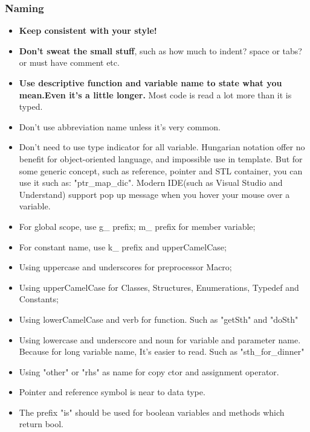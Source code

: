 \documentclass[a4paper,12pt,twoside]{book}
\begin{document}
\subsubsection{Naming}
\begin{itemize}
\item \textbf{Keep consistent with your style!}
\item \textbf{Don't sweat the small stuff}, such as how much to indent? space or tabs? or must have comment etc.

\item \textbf{Use descriptive function and variable name to state what you mean.Even it's a little longer.} Most code is read a lot more than it is typed.

\item Don't use abbreviation name unless it's very common.

\item Don't need to use type indicator for all variable. Hungarian notation offer no benefit for object-oriented language, and impossible use in template. But for some generic concept, such as reference, pointer and STL container, you can use it such as: "ptr\_map\_dic". Modern IDE(such as Visual Studio and Understand) support pop up message when you hover your mouse over a variable.

\item For global scope, use g\_ prefix; m\_ prefix for member variable;
\item For constant name, use k\_ prefix and upperCamelCase;
\item Using uppercase and underscores for preprocessor Macro;
\item Using upperCamelCase for Classes, Structures, Enumerations, Typedef and  Constants;
\item Using lowerCamelCase and verb for function. Such as "getSth" and "doSth"
\item Using lowercase and underscore  and noun for variable and parameter name. Because for long variable name, It's easier to read. Such as "sth\_for\_dinner"
\item Using "other" or "rhs" as name for copy ctor and assignment operator.
\item Pointer and reference symbol is near to data type.
 \item The prefix "is" should be used for boolean variables and methods which return bool.

\end{itemize}
\end{document}
